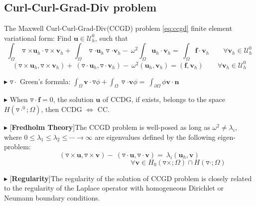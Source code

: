 \documentclass[a4paper,11pt]{article}
\begin{document}
\subsection{Curl-Curl-Grad-Div problem}
The Maxwell Curl-Curl-Grad-Div(CCGD)  problem \ref{eq:ccgd} finite element variational form: Find $\mathbf{u}\in\mathcal{U}_h^{0}$, such that
\begin{equation}\label{eq:ccgd-form}
\nonumber
\int_{\Omega}\triangledown\times\mathbf{u}_h\cdot\triangledown\times\mathbf{v}_h + \
\int_{\Omega}\triangledown\cdot\mathbf{u}_h\triangledown\cdot\mathbf{v}_h - \
 \omega^2\int_{\Omega}\mathbf{u}_h\cdot\mathbf{v}_h = \
\int_{\Omega}\mathbf{f}\cdot\mathbf{v}_h   \qquad \forall \mathbf{v}_h\in\mathcal{U}_h^{0}
\end{equation}
\begin{equation}\label{variform:ccgd}
(\triangledown\times\mathbf{u}_h , \triangledown\times\mathbf{v}_h) + \
(\triangledown\cdot\mathbf{u}_h , \triangledown\cdot\mathbf{v}_h) - \
\omega^2(\mathbf{u}_h,\mathbf{v}_h) = (\mathbf{f},\mathbf{v}_h)  \qquad \forall \mathbf{v}_h\in\mathcal{U}_h^{0}
\end{equation}

$\blacktriangleright$ $\triangledown\cdot$ Green's formula: $\int_{\Omega}\mathbf{v}\cdot\triangledown\phi + \int_{\Omega}\triangledown\cdot\mathbf{v}\phi = \
\int_{\partial\Omega}\phi\mathbf{v}\cdot\mathbf{n}$

$\blacktriangleright$ When $\triangledown\cdot\mathbf{f} = 0$, the solution $\mathbf{u}$ of CCDG, if exists, belongs to
the space $H(\triangledown\cdot^0;\Omega)$, then CCDG $\Leftrightarrow$ CC.

$\blacktriangleright$ [\textbf{Fredholm Theory}]The CCGD problem is well-posed as long as $\omega^2\neq\lambda_{i}$, where $0\leq\lambda_{1}\leq\lambda_{2}\leq\cdots\rightarrow\infty$ are eigenvalues defined by the following eigen-problem:
\begin{equation}
\nonumber
(\triangledown\times\mathbf{u} , \triangledown\times\mathbf{v}) - \
(\triangledown\cdot\mathbf{u} , \triangledown\cdot\mathbf{v}) = \
\lambda_i(\mathbf{u}_h,\mathbf{v})
\end{equation}
\[\nonumber\qquad\qquad\qquad\qquad\qquad\qquad\qquad \forall \mathbf{v}\in H_0(\triangledown\times;\Omega)\cap H(\triangledown\cdot;\Omega)\]

$\blacktriangleright$ [\textbf{Regularity}]The regularity of the solution of CCGD problem is closely related to the regularity of the
Laplace operator with homogeneous Dirichlet or Neumann boundary conditions.
\end{document}
